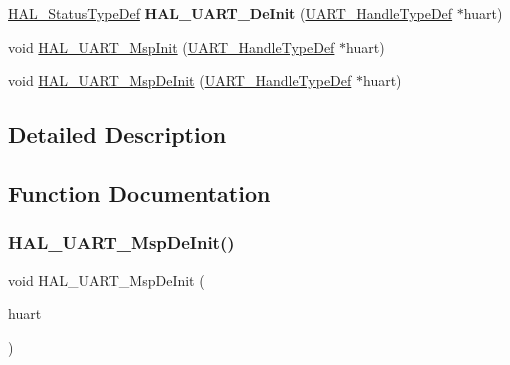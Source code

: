 \begin{DoxyCompactItemize}
\item 
\mbox{\label{group___u_a_r_t___exported___functions___group1_ga8d98eaab25e61ae12e2e240c3388c57b}} 
\mbox{\hyperlink{stm32f4xx__hal__def_8h_a63c0679d1cb8b8c684fbb0632743478f}{H\+A\+L\+\_\+\+Status\+Type\+Def}} {\bfseries H\+A\+L\+\_\+\+U\+A\+R\+T\+\_\+\+De\+Init} (\mbox{\hyperlink{struct_u_a_r_t___handle_type_def}{U\+A\+R\+T\+\_\+\+Handle\+Type\+Def}} $\ast$huart)
\item 
void \mbox{\hyperlink{group___u_a_r_t___exported___functions___group1_ga0e553b32211877322f949b14801bbfa7}{H\+A\+L\+\_\+\+U\+A\+R\+T\+\_\+\+Msp\+Init}} (\mbox{\hyperlink{struct_u_a_r_t___handle_type_def}{U\+A\+R\+T\+\_\+\+Handle\+Type\+Def}} $\ast$huart)
\item 
void \mbox{\hyperlink{group___u_a_r_t___exported___functions___group1_ga718f39804e3b910d738a0e1e46151188}{H\+A\+L\+\_\+\+U\+A\+R\+T\+\_\+\+Msp\+De\+Init}} (\mbox{\hyperlink{struct_u_a_r_t___handle_type_def}{U\+A\+R\+T\+\_\+\+Handle\+Type\+Def}} $\ast$huart)
\end{DoxyCompactItemize}


\subsection{Detailed Description}


\subsection{Function Documentation}
\mbox{\label{group___u_a_r_t___exported___functions___group1_ga718f39804e3b910d738a0e1e46151188}} 
\subsubsection{\texorpdfstring{H\+A\+L\+\_\+\+U\+A\+R\+T\+\_\+\+Msp\+De\+Init()}{HAL\_UART\_MspDeInit()}}
{\footnotesize\ttfamily void H\+A\+L\+\_\+\+U\+A\+R\+T\+\_\+\+Msp\+De\+Init (\begin{DoxyParamCaption}\item[{\mbox{\hyperlink{struct_u_a_r_t___handle_type_def}{U\+A\+R\+T\+\_\+\+Handle\+Type\+Def}} $\ast$}]{huart }\end{DoxyParamCaption})}

